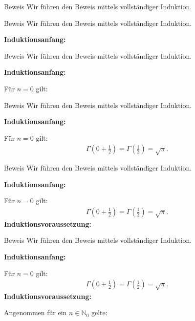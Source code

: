 \documentclass[10pt]{beamer}
\def\bN{\mathbb{N}}
\begin{document}
\begin{frame}{Beweis}
    Wir führen den Beweis mittels vollständiger Induktion. 
\end{frame}



\begin{frame}{Beweis}
    Wir führen den Beweis mittels vollständiger Induktion.

    \textbf{Induktionsanfang:}
\end{frame}



\begin{frame}{Beweis}
    Wir führen den Beweis mittels vollständiger Induktion.

    \textbf{Induktionsanfang:}

    Für \( n = 0 \) gilt:
\end{frame}



\begin{frame}{Beweis}
    Wir führen den Beweis mittels vollständiger Induktion.

    \textbf{Induktionsanfang:}
    
    Für \( n = 0 \) gilt:
    \begin{align*}
        \Gamma\left( 0 + \frac{1}{2} \right)
        = \Gamma\left( \frac{1}{2} \right) 
        = \sqrt{\pi}.
    \end{align*}
\end{frame}



\begin{frame}{Beweis}
    Wir führen den Beweis mittels vollständiger Induktion.

    \textbf{Induktionsanfang:}
    
    Für \( n = 0 \) gilt:
    \begin{align*}
        \Gamma\left( 0 + \frac{1}{2} \right)
        = \Gamma\left( \frac{1}{2} \right) 
        = \sqrt{\pi}.
    \end{align*}
    \textbf{Induktionsvoraussetzung:}
\end{frame}



\begin{frame}{Beweis}
    Wir führen den Beweis mittels vollständiger Induktion.

    \textbf{Induktionsanfang:}
    
    Für \( n = 0 \) gilt:
    \begin{align*}
        \Gamma\left( 0 + \frac{1}{2} \right)
        = \Gamma\left( \frac{1}{2} \right) 
        = \sqrt{\pi}.
    \end{align*}
    \textbf{Induktionsvoraussetzung:}

    Angenommen für ein \( n \in \bN_{0} \) gelte:
\end{frame}
\end{document}
